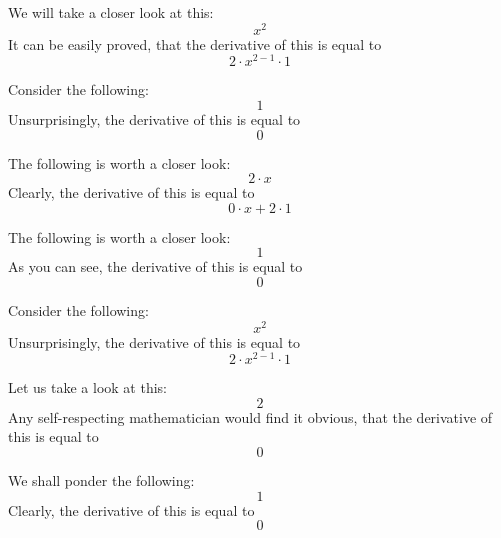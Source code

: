 \documentclass{article}
\begin{document}
We will take a closer look at this:
\begin{equation}
x ^{2 } 
\end{equation}
It can be easily proved, that the derivative of this is equal to
\begin{equation}
2 \cdot x ^{2 - 1 } \cdot 1 
\end{equation}

Consider the following:
\begin{equation}
1 
\end{equation}
Unsurprisingly, the derivative of this is equal to
\begin{equation}
0 
\end{equation}

The following is worth a closer look:
\begin{equation}
2 \cdot x 
\end{equation}
Clearly, the derivative of this is equal to
\begin{equation}
0 \cdot x + 2 \cdot 1 
\end{equation}

The following is worth a closer look:
\begin{equation}
1 
\end{equation}
As you can see, the derivative of this is equal to
\begin{equation}
0 
\end{equation}

Consider the following:
\begin{equation}
x ^{2 } 
\end{equation}
Unsurprisingly, the derivative of this is equal to
\begin{equation}
2 \cdot x ^{2 - 1 } \cdot 1 
\end{equation}

Let us take a look at this:
\begin{equation}
2 
\end{equation}
Any self-respecting mathematician would find it obvious, that the derivative of this is equal to
\begin{equation}
0 
\end{equation}

We shall ponder the following:
\begin{equation}
1 
\end{equation}
Clearly, the derivative of this is equal to
\begin{equation}
0 
\end{equation}
\end{document}
